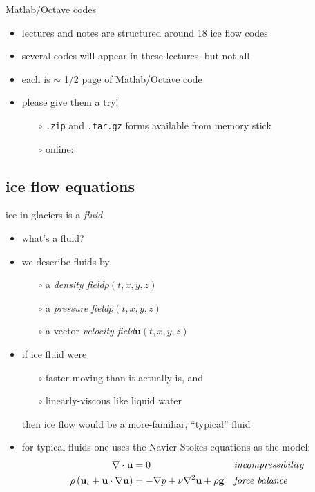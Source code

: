 \begin{frame}{Matlab/Octave codes}

\begin{itemize}
\item lectures and notes are structured around 18 ice flow codes
\item several codes will appear in these lectures, but not all
\item each is $\sim$ 1/2 page of Matlab/Octave code
\item please give them a try!

  \begin{itemize}
  \item[$\circ$] \texttt{.zip} and \texttt{.tar.gz} forms available from memory stick
  \item[$\circ$] online:

  \bigskip\bigskip\small
  \centerline{}
  
  \end{itemize}
\end{itemize}
\end{frame}


\subsection{ice flow equations}

\begin{frame}{ice in glaciers is a \emph{fluid}}

\begin{itemize}
\item what's a fluid?
\item we describe fluids by
  \begin{itemize}
  \item[$\circ$] a \emph{density field}\quad $\rho(t,x,y,z)$
  \item[$\circ$] a \emph{pressure field}\quad $p(t,x,y,z)$
  \item[$\circ$] a vector \emph{velocity field}\quad $\mathbf{u}(t,x,y,z)$
  \end{itemize}

\bigskip\bigskip

\item if ice fluid were
  \begin{itemize}
  \item[$\circ$] faster-moving than it actually is, and
  \item[$\circ$] linearly-viscous like liquid water
  \end{itemize}
  
  then ice flow would be a more-familiar, ``typical'' fluid
\item for typical fluids one uses the Navier-Stokes equations as the model:
\begin{align*}
\nabla \cdot \mathbf{u} &= 0 &&\text{\emph{incompressibility}} \\
\rho \left(\mathbf{u}_t + \mathbf{u}\cdot\nabla \mathbf{u}\right) &= -\nabla p + \nu \nabla^2 \mathbf{u} + \rho \mathbf{g} &&\text{\emph{force balance}}
\end{align*}
\end{itemize}
\end{frame}


